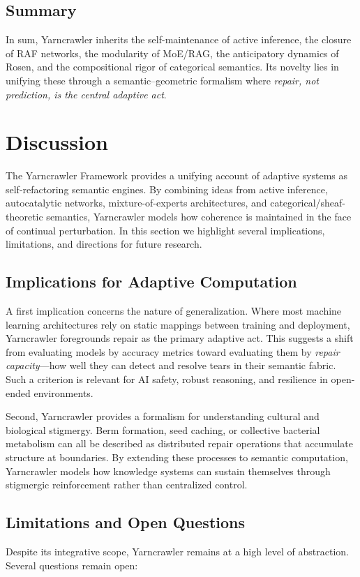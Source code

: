 \documentclass{article}
\begin{document}
\subsection{Summary}
In sum, Yarncrawler inherits the self-maintenance of active inference, the closure of RAF networks, the modularity of MoE/RAG, the anticipatory dynamics of Rosen, and the compositional rigor of categorical semantics. 
Its novelty lies in unifying these through a semantic–geometric formalism where \emph{repair, not prediction, is the central adaptive act}.

\section{Discussion}

The Yarncrawler Framework provides a unifying account of adaptive systems as self-refactoring semantic engines. By combining ideas from active inference, autocatalytic networks, mixture-of-experts architectures, and categorical/sheaf-theoretic semantics, Yarncrawler models how coherence is maintained in the face of continual perturbation. In this section we highlight several implications, limitations, and directions for future research.

\subsection{Implications for Adaptive Computation}
A first implication concerns the nature of generalization. Where most machine learning architectures rely on static mappings between training and deployment, Yarncrawler foregrounds repair as the primary adaptive act. This suggests a shift from evaluating models by accuracy metrics toward evaluating them by \emph{repair capacity}—how well they can detect and resolve tears in their semantic fabric. Such a criterion is relevant for AI safety, robust reasoning, and resilience in open-ended environments.

Second, Yarncrawler provides a formalism for understanding cultural and biological stigmergy. Berm formation, seed caching, or collective bacterial metabolism can all be described as distributed repair operations that accumulate structure at boundaries. By extending these processes to semantic computation, Yarncrawler models how knowledge systems can sustain themselves through stigmergic reinforcement rather than centralized control.

\subsection{Limitations and Open Questions}
Despite its integrative scope, Yarncrawler remains at a high level of abstraction. Several questions remain open:
\end{document}
